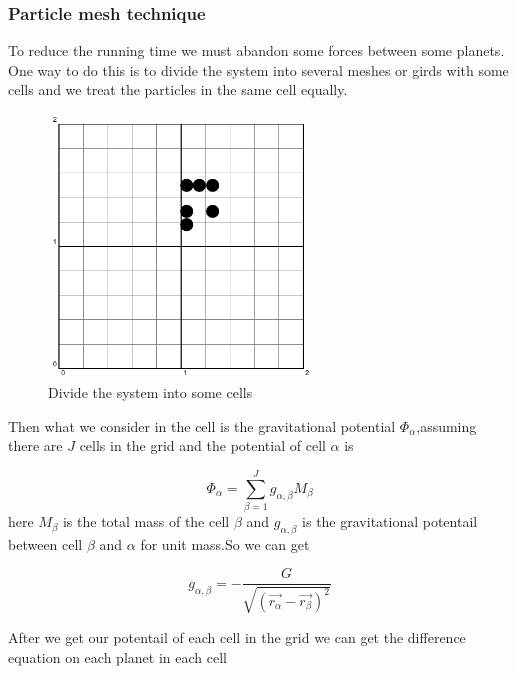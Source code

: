 \documentclass[12pt]{article}
\begin{document}
\subsubsection{Particle mesh technique}
To reduce the running time we must abandon some forces between some planets.
One way to do this is to divide the system into several meshes or girds with some cells
and we treat the particles in the same cell equally.

\begin{figure}[H]
\centering
\includegraphics[width=7cm,height=7cm]{grid.pdf}
\caption{Divide the system into some cells}
\end{figure}

Then what we consider in the cell is the gravitational potential $\Phi_{\alpha}$,assuming there are $J$ cells in the grid
and the potential of cell $\alpha$ is

\begin{equation}
\Phi_{\alpha}=\sum_{\beta=1}^{J}g_{\alpha , \beta}M_{\beta}
\end{equation}
here $M_{\beta}$ is the total mass of the cell $\beta$ and $g_{\alpha , \beta}$ is the gravitational potentail between 
cell $\beta$ and $\alpha$ for unit mass.So we can get

\begin{equation}
g_{\alpha , \beta}=-\frac{G}{\sqrt{\left( \vec{r_{\alpha}} -\vec{r_{\beta}} \right)^2}}
\end{equation}

After we get our potentail of each cell in the grid we can get the difference equation on each planet in each cell
\end{document}
